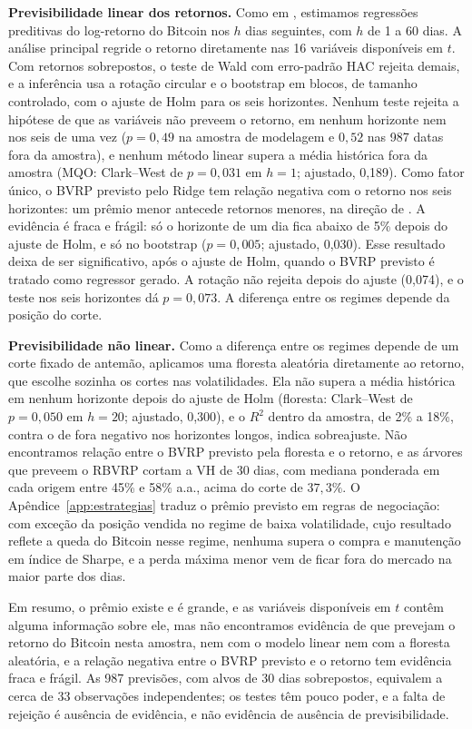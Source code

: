 \noindent\textbf{Previsibilidade linear dos retornos.} Como em
\citet{bollerslev2009expected}, estimamos regressões preditivas do
log-retorno do Bitcoin nos $h$ dias seguintes, com $h$ de 1 a 60 dias. A
análise principal regride o retorno diretamente nas 16 variáveis disponíveis
em $t$. Com retornos sobrepostos, o teste de Wald com erro-padrão HAC rejeita
demais, e a inferência usa a rotação circular e o bootstrap em blocos, de
tamanho controlado, com o ajuste de Holm para os seis horizontes. Nenhum teste
rejeita a hipótese de que as variáveis não preveem o retorno, em nenhum
horizonte nem nos seis de uma vez ($p = 0{,}49$ na amostra de modelagem e
$0{,}52$ nas 987 datas fora da amostra), e nenhum método linear supera a média
histórica fora da amostra (MQO: Clark--West de $p = 0{,}031$ em $h = 1$;
ajustado, 0,189). Como fator único, o BVRP previsto pelo Ridge tem relação
negativa com o retorno nos seis horizontes: um prêmio menor antecede retornos
menores, na direção de \citet{bollerslev2009expected}. A evidência é fraca e
frágil: só o horizonte de um dia fica abaixo de 5\% depois do ajuste de Holm,
e só no bootstrap ($p = 0{,}005$; ajustado, 0,030). Esse resultado deixa de
ser significativo, após o ajuste de Holm, quando o BVRP previsto é tratado
como regressor gerado. A rotação não rejeita depois do ajuste (0,074), e o
teste nos seis horizontes dá $p = 0{,}073$. A
diferença entre os regimes depende da posição do corte.

\noindent\textbf{Previsibilidade não linear.} Como a diferença entre os regimes depende
de um corte fixado de antemão, aplicamos uma floresta aleatória
diretamente ao retorno, que escolhe sozinha os cortes nas volatilidades. Ela
não supera a média histórica em nenhum horizonte depois do ajuste de Holm
(floresta: Clark--West de $p = 0{,}050$ em $h = 20$; ajustado, 0,300), e o
$R^2$ dentro da amostra, de 2\% a 18\%, contra o de fora negativo nos
horizontes longos, indica sobreajuste. Não encontramos relação entre o BVRP
previsto pela floresta e o retorno, e as árvores que preveem o RBVRP cortam a VH de 30 dias,
com mediana ponderada em cada origem entre 45\% e 58\% a.a., acima do corte
de $37{,}3\%$. O
Apêndice~\ref{app:estrategias} traduz o prêmio previsto em regras de negociação: com exceção da posição
vendida no regime de baixa volatilidade, cujo resultado reflete a queda do
Bitcoin nesse regime, nenhuma supera o compra e manutenção
em índice de Sharpe, e a perda máxima menor vem de ficar fora do mercado na
maior parte dos dias.

Em resumo, o prêmio existe e é grande, e as variáveis disponíveis em $t$
contêm alguma informação sobre ele, mas não encontramos evidência de que
prevejam o retorno do Bitcoin nesta amostra, nem com o modelo linear nem com a floresta aleatória, e a
relação negativa entre o BVRP previsto e o retorno tem evidência fraca e
frágil. As 987 previsões, com alvos de 30 dias sobrepostos, equivalem a cerca
de 33 observações independentes; os testes têm pouco poder, e a falta de
rejeição é ausência de evidência, e não evidência de ausência de
previsibilidade.

